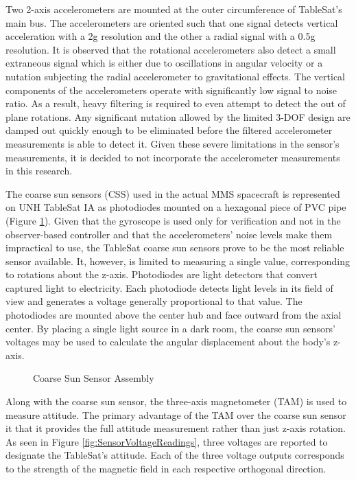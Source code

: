 Two 2-axis accelerometers are mounted at the outer circumference of TableSat's main bus.  The accelerometers are oriented such that one signal detects vertical acceleration with a 2g resolution and the other a radial signal with a 0.5g resolution.  It is observed that the rotational accelerometers also detect a small extraneous signal which is either due to oscillations in angular velocity or a nutation subjecting the radial accelerometer to gravitational effects.  The vertical components of the accelerometers operate with significantly low signal to noise ratio.  As a result, heavy filtering is required to even attempt to detect the out of plane rotations.  Any significant nutation allowed by the limited 3-DOF design are damped out quickly enough to be eliminated before the filtered accelerometer measurements is able to detect it.  Given these severe limitations in the sensor's measurements, it is decided to not incorporate the accelerometer measurements in this research.

The coarse sun sensors (CSS) used in the actual MMS spacecraft is represented on UNH TableSat IA as photodiodes mounted on a hexagonal piece of PVC pipe (Figure \ref{fig:CoarseSunSensorAssembly}).  Given that the gyroscope is used only for verification and not in the observer-based controller and that the accelerometers' noise levels make them impractical to use, the TableSat coarse sun sensors prove to be the most reliable sensor available.  It, however, is limited to measuring a single value, corresponding to rotations about the z-axis.  Photodiodes are light detectors that convert captured light to electricity.  Each photodiode detects light levels in its field of view and generates a voltage generally proportional to that value.  The photodiodes are mounted above the center hub and face outward from the axial center.  By placing a single light source in a dark room, the coarse sun sensors' voltages may be used to calculate the angular displacement about the body's z-axis.

\begin{figure}[ht]
  \centerline{}
  \caption{Coarse Sun Sensor Assembly}
  \label{fig:CoarseSunSensorAssembly}
\end{figure}

Along with the coarse sun sensor, the three-axis magnetometer (TAM) is used to measure attitude.  The primary advantage of the TAM over the coarse sun sensor it that it provides the full attitude measurement rather than just z-axis rotation.  As seen in Figure \ref{fig:SensorVoltageReadings}, three voltages are reported to designate the TableSat's attitude.  Each of the three voltage outputs corresponds to the strength of the magnetic field in each respective orthogonal direction.

